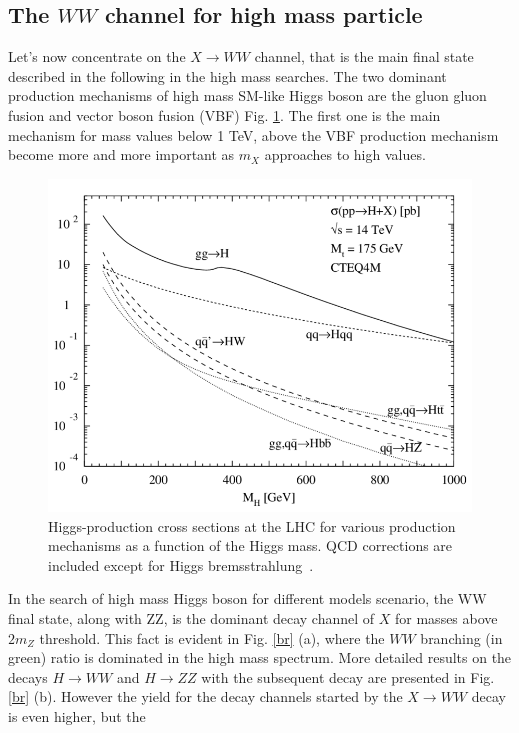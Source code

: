 \subsection*{The $WW$ channel for high mass particle}
Let’s now concentrate on the $X \to WW$ channel, that is the main final state described in the following in the high mass searches.
The two dominant production mechanisms of high mass SM-like Higgs boson are the
gluon gluon fusion and vector boson fusion (VBF) Fig. \ref{prod}. 
The first one is the main mechanism for mass values below 1 TeV, above the VBF production mechanism become more and more important as $m_X$ approaches to high values.
\begin{figure}
\centering
\includegraphics[scale= 0.3]{../Cap1/Higgs-production-cross-sections-at-the-LHC-for-various-production-mechanisms-as-a}
\caption{Higgs-production cross sections at the LHC for various production mechanisms as a function of the Higgs mass. QCD corrections are included except for Higgs bremsstrahlung~\cite{Djouadi2004}.}
\label{prod}
\end{figure}
In the search of high mass Higgs boson for different models scenario, the WW final state, along with ZZ, is the dominant decay channel of $X$ for masses above $2m_Z$ threshold. This fact is evident in Fig. \ref{br} (a), where the $WW$ branching (in green) ratio is dominated in the high mass spectrum. More detailed results on the decays $H \to WW$ and $H \to ZZ $ with the subsequent decay are presented in Fig. \ref{br} (b).
However the yield for the decay channels started by the $X \to WW$ decay is even higher, but the
